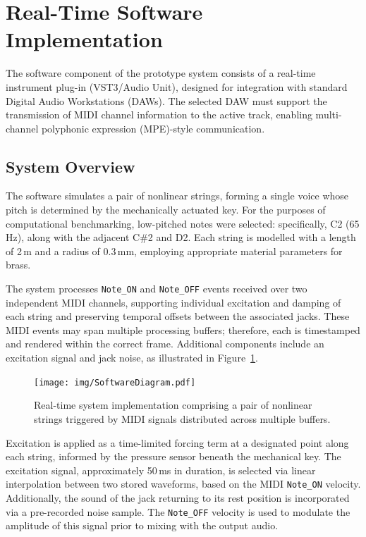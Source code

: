 \section{Real-Time Software Implementation}

The software component of the prototype system consists of a real-time instrument plug-in (VST3/Audio Unit), designed for integration with standard Digital Audio Workstations (DAWs). The selected DAW must support the transmission of MIDI channel information to the active track, enabling multi-channel polyphonic expression (MPE)-style communication.

\subsection{System Overview}

The software simulates a pair of nonlinear strings, forming a single voice whose pitch is determined by the mechanically actuated key. For the purposes of computational benchmarking, low-pitched notes were selected: specifically, C2 (65\,Hz), along with the adjacent C\#2 and D2. Each string is modelled with a length of 2\,m and a radius of 0.3\,mm, employing appropriate material parameters for brass.

The system processes \texttt{Note\_ON} and \texttt{Note\_OFF} events received over two independent MIDI channels, supporting individual excitation and damping of each string and preserving temporal offsets between the associated jacks. These MIDI events may span multiple processing buffers; therefore, each is timestamped and rendered within the correct frame. Additional components include an excitation signal and jack noise, as illustrated in Figure~\ref{fig:software diagram}.

\begin{figure}
    \centering
    \texttt{[image: img/SoftwareDiagram.pdf]}
    \caption{Real-time system implementation comprising a pair of nonlinear strings triggered by MIDI signals distributed across multiple buffers.}
    \label{fig:software diagram}
\end{figure}

Excitation is applied as a time-limited forcing term at a designated point along each string, informed by the pressure sensor beneath the mechanical key. The excitation signal, approximately 50\,ms in duration, is selected via linear interpolation between two stored waveforms, based on the MIDI \texttt{Note\_ON} velocity. Additionally, the sound of the jack returning to its rest position is incorporated via a pre-recorded noise sample. The \texttt{Note\_OFF} velocity is used to modulate the amplitude of this signal prior to mixing with the output audio.

